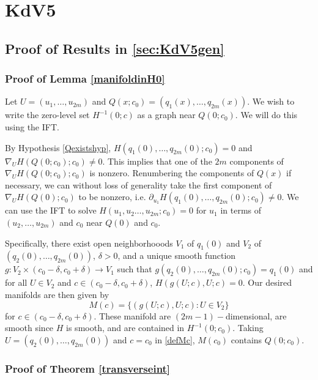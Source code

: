\documentclass[thesis.tex]{subfiles}
\begin{document}
\iffulldocument\else
	\chapter{KdV5}
\fi

\section{Proof of Results in \cref{sec:KdV5gen} }

\subsection{Proof of Lemma \ref{manifoldinH0}}

Let $U = (u_1, \dots, u_{2m})$ and $Q(x; c_0) = (q_1(x), \dots, q_{2m}(x))$. We wish to write the zero-level set $H^{-1}(0; c)$ as a graph near $Q(0; c_0)$. We will do this using the IFT.

By Hypothesis \ref{Qexistshyp}, $H(q_1(0), \dots, q_{2m}(0); c_0) = 0$ and $\nabla_U H(Q(0; c_0); c_0) \neq 0$. This implies that one of the $2m$ components of $\nabla_U H(Q(0; c_0); c_0)$ is nonzero. Renumbering the components of $Q(x)$ if necessary, we can without loss of generality take the first component of $\nabla_U H(Q(0); c_0)$ to be nonzero, i.e. $\partial_{u_1}H(q_1(0), \dots, q_{2m}(0); c_0) \neq 0$. We can use the IFT to solve $H(u_1, u_2 \dots, u_{2m}; c_0) = 0$ for $u_1$ in terms of $(u_2, \dots, u_{2m})$ and $c_0$ near $Q(0)$ and $c_0$.

Specifically, there exist open neighborhooods $V_1$ of $q_1(0)$ and $V_2$ of $(q_2(0), \dots, q_{2m}(0))$, $\delta > 0$, and a unique smooth function $g: V_2 \times (c_0 - \delta, c_0 + \delta) \rightarrow V_1$ such that $g(q_2(0), \dots, q_{2m}(0); c_0) = q_1(0)$ and for all $U \in V_2$ and $c \in (c_0 - \delta, c_0 + \delta)$, $H(g(U; c),U; c) = 0$. Our desired manifolds are then given by
\begin{equation}\label{defMc}
M(c) = \{ (g(U; c), U; c) : U \in V_2 \}
\end{equation}
for $c \in (c_0 - \delta, c_0 + \delta)$. These manifold are $(2m-1)-$dimensional, are smooth since $H$ is smooth, and are contained in $H^{-1}(0; c_0)$. Taking $U = (q_2(0), \dots, q_{2m}(0))$ and $c = c_0$ in \eqref{defMc}, $M(c_0)$ contains $Q(0; c_0)$.

\subsection{Proof of Theorem \ref{transverseint}}
\end{document}
